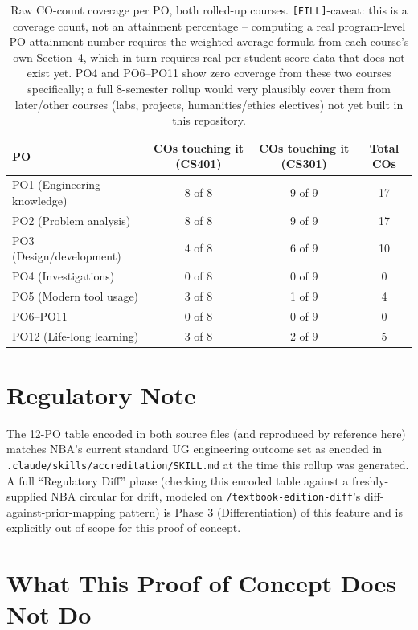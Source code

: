 \documentclass[11pt]{article}
\begin{document}
\begin{table}[ht]
\centering
\small
\begin{tabular}{@{}l c c c@{}}
\toprule
PO & COs touching it (CS401) & COs touching it (CS301) & Total COs \\
\midrule
PO1 (Engineering knowledge)      & 8 of 8 & 9 of 9 & 17 \\
PO2 (Problem analysis)           & 8 of 8 & 9 of 9 & 17 \\
PO3 (Design/development)         & 4 of 8 & 6 of 9 & 10 \\
PO4 (Investigations)             & 0 of 8 & 0 of 9 & 0 \\
PO5 (Modern tool usage)          & 3 of 8 & 1 of 9 & 4 \\
PO6--PO11                        & 0 of 8 & 0 of 9 & 0 \\
PO12 (Life-long learning)        & 3 of 8 & 2 of 9 & 5 \\
\bottomrule
\end{tabular}
\caption{Raw CO-count coverage per PO, both rolled-up courses. \texttt{[FILL]}-caveat: this is a coverage count, not an attainment percentage -- computing a real program-level PO attainment number requires the weighted-average formula from each course's own Section~4, which in turn requires real per-student score data that does not exist yet. PO4 and PO6--PO11 show zero coverage from these two courses specifically; a full 8-semester rollup would very plausibly cover them from later/other courses (labs, projects, humanities/ethics electives) not yet built in this repository.}
\label{tab:po-coverage}
\end{table}

\section{Regulatory Note}
\label{sec:regulatory}

The 12-PO table encoded in both source files (and reproduced by reference here) matches NBA's current standard UG engineering outcome set as encoded in \texttt{.claude/skills/accreditation/SKILL.md} at the time this rollup was generated. A full ``Regulatory Diff'' phase (checking this encoded table against a freshly-supplied NBA circular for drift, modeled on \texttt{/textbook-edition-diff}'s diff-against-prior-mapping pattern) is Phase 3 (Differentiation) of this feature and is explicitly out of scope for this proof of concept.

\section{What This Proof of Concept Does Not Do}
\end{document}
